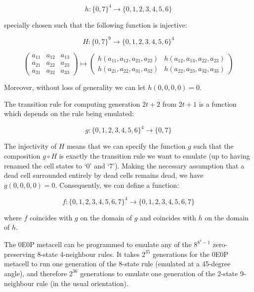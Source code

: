 $$ h : \{ 0, 7 \}^4 \rightarrow \{ 0, 1, 2, 3, 4, 5, 6 \} $$

specially chosen such that the following function is injective:

$$ H : \{ 0, 7 \}^9 \rightarrow \{ 0, 1, 2, 3, 4, 5, 6 \}^4 $$


$$ \begin{pmatrix}
a_{11} & a_{12} & a_{13} \\
a_{21} & a_{22} & a_{23} \\
a_{31} & a_{32} & a_{33}
\end{pmatrix} \mapsto \begin{pmatrix}
h(a_{11}, a_{12}, a_{21}, a_{22}) & h(a_{12}, a_{13}, a_{22}, a_{23}) \\
h(a_{21}, a_{22}, a_{31}, a_{32}) & h(a_{22}, a_{23}, a_{32}, a_{33})
\end{pmatrix} $$

Moreover, without loss of generality we can let $h(0, 0, 0, 0) = 0$.

The transition rule for computing generation $2t + 2$ from $2t + 1$ is a
function which depends on the rule being emulated:

$$ g : \{ 0, 1, 2, 3, 4, 5, 6 \}^4 \rightarrow \{ 0, 7 \} $$

The injectivity of $H$ means that we can specify the function $g$
such that the composition $g \circ H$ is exactly the transition rule
we want to emulate (up to having renamed the cell states to `0' and `7').
Making the necessary assumption that a dead cell surrounded entirely by
dead cells remains dead, we have $g(0, 0, 0, 0) = 0$. Consequently, we
can define a function:

$$ f : \{ 0, 1, 2, 3, 4, 5, 6, 7 \}^4 \rightarrow
\{0, 1, 2, 3, 4, 5, 6, 7 \} $$

where $f$ coincides with $g$ on the domain of $g$ and coincides with $h$
on the domain of $h$.


The 0E0P metacell can be programmed to emulate any of the $8^{8^4-1}$
zero-preserving 8-state 4-neighbour rules. It takes $2^{35}$ generations
for the 0E0P metacell to run one generation of the 8-state rule (emulated
at a 45-degree angle), and therefore $2^{36}$ generations to emulate one
generation of the 2-state 9-neighbour rule (in the usual orientation).

